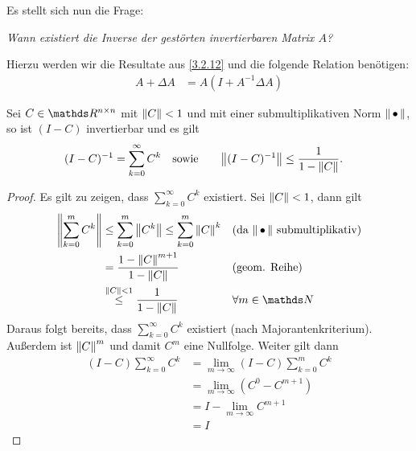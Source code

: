Es stellt sich nun die Frage:

\textit{Wann existiert die Inverse der gestörten invertierbaren Matrix $A$?}

Hierzu werden wir die Resultate aus \ref{3.2.12} 
und die folgende Relation benötigen:
\begin{align*}
  A+\Delta A &= A (I+A^{-1}\Delta A)
\end{align*}


\begin{Leme}
  \label{3.2.12}
  \addtocounter{equation}{1}
  Sei $C\in\Renn$ mit $\nn[C]<1$ und mit einer 
  submultiplikativen Norm $\nn$,
  so ist $(I-C)$ invertierbar und es gilt
  \begin{align*}
    (I-C)^{-1}&=\sum_{k=0}^{\infty}C^k & \text{sowie} &\quad&
                                                              \nn[(I-C)^ {-1}] &\leq \frac{1}{1-\nn[C]}.
  \end{align*}
\end{Leme}

\begin{proof}
  Es gilt zu zeigen, dass $\sum_{k=0}^{\infty}C^k$ existiert.
  Sei $\nn[C] < 1$, dann gilt
  \begin{align*}
    \nn[ \sum_{k=0}^{m} C^k ] 
    &\leq \sum_{k=0}^{m} \nn[C^k ]  
      \leq \sum_{k=0}^{m}\nn[C]^k 
    && \text{(da $\nn$ submultiplikativ)}\\
    &= \frac{1-\nn[C]^{m+1}}{1-\nn[C]}
    &&\text{(geom. Reihe)}\\
    &\overset{\nn[C]<1}{\leq} \frac{1}{1-\nn[C]} 
    && \forall m\in \N
  \end{align*}
  Daraus folgt bereits, 
  dass $\sum_{k=0}^{\infty}C^k$ existiert (nach Majorantenkriterium).
  Außerdem ist $\nn[C]^m$ und damit $C^m$ eine Nullfolge.
  Weiter gilt dann
  \begin{align*}
    (I-C) \sum_{k=0}^{\infty}C^k 
    &= \lim_{m\to \infty}(I-C) \sum_{k=0}^{m}C^k \\
    &= \lim_{m\to \infty} (C^0-C^{m+1}) \\
    &= I - \lim_{m\to \infty} C^{m+1} \\
    &=I 
  \end{align*}
\end{proof}

